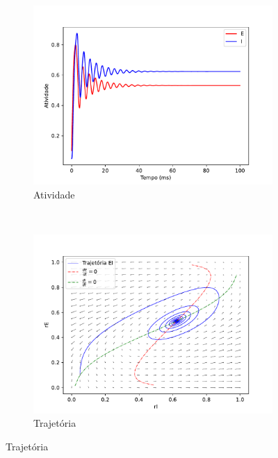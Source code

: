 \begin{figure}
	\centering
	\caption{Comportamento das simulações do modelo de Wilson-Cowan}
	\label{fig:wilson_cowan}
	\begin{subfigure}[b]{0.49\textwidth}
		\caption{Atividade}
		\label{fig:ww_atividade}
		\includegraphics[width=\textwidth]{figs/ww_atividade}
	\end{subfigure}
	~
	\begin{subfigure}[b]{0.49\textwidth}
		\caption{Trajetória}
		\label{fig:ww_trajetoria}
		\includegraphics[width=\textwidth]{figs/ww_trajetoria}
	\end{subfigure}
\end{figure}

